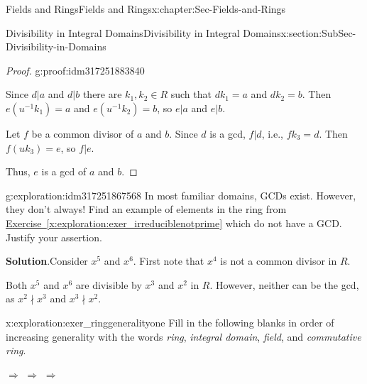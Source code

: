 \documentclass[oneside,10pt,]{book}
\newcommand{\blocktitlefont}{\relax}
\newcommand{\xreffont}{\relax}
\numberwithin{equation}{section}
\begin{document}
\begin{chapterptx}{Fields and Rings}{}{Fields and Rings}{}{}{x:chapter:Sec-Fields-and-Rings}
\begin{sectionptx}{Divisibility in Integral Domains}{}{Divisibility in Integral Domains}{}{}{x:section:SubSec-Divisibility-in-Domains}
\begin{proof}{}{g:proof:idm317251883840}
\par
Since \(d|a\) and \(d|b\) there are \(k_1,k_2\in R\) such that \(d k_1 = a\) and \(d k_2 = b\). Then \(e (u^{-1} k_1) = a\) and \(e (u^{-1} k_2) = b\), so \(e|a\) and \(e|b\).%
\par
Let \(f\) be a common divisor of \(a\) and \(b\). Since \(d\) is a gcd, \(f|d\), i.e., \(f k_3 = d\). Then \(f (uk_3) = e\), so \(f|e\).%
\par
Thus, \(e\) is a gcd of \(a\) and \(b\).%
\end{proof}
\begin{exploration}{}{g:exploration:idm317251867568}%
In most familiar domains, GCDs exist. However, they don't always! Find an example of elements in the ring from \hyperref[x:exploration:exer_irreduciblenotprime]{Exercise~{\xreffont\ref{x:exploration:exer_irreduciblenotprime}}} which do not have a GCD. Justify your assertion.%
\par\smallskip%
\noindent\textbf{\blocktitlefont Solution}.\hypertarget{g:solution:idm317251866240}{}\quad{}Consider \(x^5\) and \(x^6\). First note that \(x^4\) is not a common divisor in \(R\).%
\par
Both \(x^5\) and \(x^6\) are divisible by \(x^3\) and \(x^2\) in \(R\). However, neither can be the gcd, as \(x^2\nmid x^3\) and \(x^3\nmid x^2\).%
\end{exploration}
\begin{exploration}{}{x:exploration:exer_ringgeneralityone}%
Fill in the following blanks in order of increasing generality with the words \emph{ring}, \emph{integral domain}, \emph{field}, and \emph{commutative ring}.%
\par
\textunderscore{}\textunderscore{}\textunderscore{}\textunderscore{}\textunderscore{}\textunderscore{}\textunderscore{}\textunderscore{}\textunderscore{}\textunderscore{} \(\Rightarrow\) \textunderscore{}\textunderscore{}\textunderscore{}\textunderscore{}\textunderscore{}\textunderscore{}\textunderscore{}\textunderscore{}\textunderscore{}\textunderscore{} \(\Rightarrow\) \textunderscore{}\textunderscore{}\textunderscore{}\textunderscore{}\textunderscore{}\textunderscore{}\textunderscore{}\textunderscore{}\textunderscore{}\textunderscore{} \(\Rightarrow\) \textunderscore{}\textunderscore{}\textunderscore{}\textunderscore{}\textunderscore{}\textunderscore{}\textunderscore{}\textunderscore{}\textunderscore{}\textunderscore{}%
\end{exploration}
\end{sectionptx}
%
%
\typeout{************************************************}

\end{chapterptx}
\end{document}
